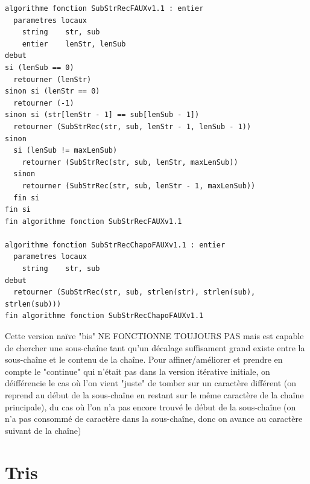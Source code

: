 \documentclass[11pt,a4paper]{article}
\begin{document}
\begin{table}[ht!]
  \centering
\begin{lstlisting}[style=algorithmique]
algorithme fonction SubStrRecFAUXv1.1 : entier
  parametres locaux
    string    str, sub
    entier    lenStr, lenSub
debut
si (lenSub == 0)
  retourner (lenStr)
sinon si (lenStr == 0)
  retourner (-1)
sinon si (str[lenStr - 1] == sub[lenSub - 1])
  retourner (SubStrRec(str, sub, lenStr - 1, lenSub - 1))
sinon
  si (lenSub != maxLenSub)
    retourner (SubStrRec(str, sub, lenStr, maxLenSub))
  sinon
    retourner (SubStrRec(str, sub, lenStr - 1, maxLenSub))
  fin si
fin si
fin algorithme fonction SubStrRecFAUXv1.1

algorithme fonction SubStrRecChapoFAUXv1.1 : entier
  parametres locaux
    string    str, sub
debut
  retourner (SubStrRec(str, sub, strlen(str), strlen(sub), strlen(sub)))
fin algorithme fonction SubStrRecChapoFAUXv1.1 \end{lstlisting}
  \caption{Cette version naïve "bis" NE FONCTIONNE TOUJOURS PAS mais est capable de chercher une sous-chaîne tant qu'un décalage suffisament grand existe entre la sous-chaîne et le contenu de la chaîne. Pour affiner/améliorer et prendre en compte le "continue" qui n'était pas dans la version itérative initiale, on déifférencie le cas où l'on vient "juste" de tomber sur un caractère différent (on reprend au début de la sous-chaîne en restant sur le même caractère de la chaîne principale), du cas où l'on n'a pas encore trouvé le début de la sous-chaîne (on n'a pas consommé de caractère dans la sous-chaîne, donc on avance au caractère suivant de la chaîne) }
\end{table}


\vfillLast

\newpage


\section{Tris}

\bigskip

\end{document}
